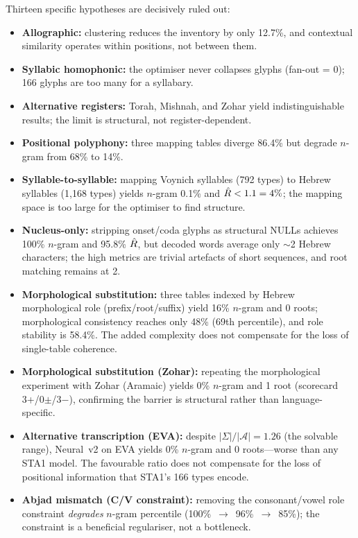 Thirteen specific hypotheses are decisively ruled out:
\begin{itemize}[nosep]
  \item \textbf{Allographic:} clustering reduces the inventory by only 12.7\%, and contextual similarity operates within positions, not between them.
  \item \textbf{Syllabic homophonic:} the optimiser never collapses glyphs (fan-out = 0); 166 glyphs are too many for a syllabary.
  \item \textbf{Alternative registers:} Torah, Mishnah, and Zohar yield indistinguishable results; the limit is structural, not register-dependent.
  \item \textbf{Positional polyphony:} three mapping tables diverge 86.4\% but degrade $n$-gram from 68\% to 14\%.
  \item \textbf{Syllable-to-syllable:} mapping Voynich syllables (792 types) to Hebrew syllables (1,168 types) yields $n$-gram 0.1\% and $\hat{R} < 1.1 = 4\%$; the mapping space is too large for the optimiser to find structure.
  \item \textbf{Nucleus-only:} stripping onset/coda glyphs as structural NULLs achieves 100\% $n$-gram and 95.8\% $\hat{R}$, but decoded words average only $\sim$2 Hebrew characters; the high metrics are trivial artefacts of short sequences, and root matching remains at 2.
  \item \textbf{Morphological substitution:} three tables indexed by Hebrew morphological role (prefix/root/suffix) yield 16\% $n$-gram and 0 roots; morphological consistency reaches only 48\% (69th percentile), and role stability is 58.4\%.  The added complexity does not compensate for the loss of single-table coherence.
  \item \textbf{Morphological substitution (Zohar):} repeating the morphological experiment with Zohar (Aramaic) yields 0\% $n$-gram and 1 root (scorecard 3+/0$\pm$/3$-$), confirming the barrier is structural rather than language-specific.
  \item \textbf{Alternative transcription (EVA):} despite $|\Sigma|/|\mathcal{A}| = 1.26$ (the solvable range), Neural~v2 on EVA yields 0\% $n$-gram and 0 roots---worse than any STA1 model.  The favourable ratio does not compensate for the loss of positional information that STA1's 166 types encode.
  \item \textbf{Abjad mismatch (C/V constraint):} removing the consonant/vowel role constraint \emph{degrades} $n$-gram percentile (100\%~$\to$~96\%~$\to$~85\%); the constraint is a beneficial regulariser, not a bottleneck.

\end{itemize}
